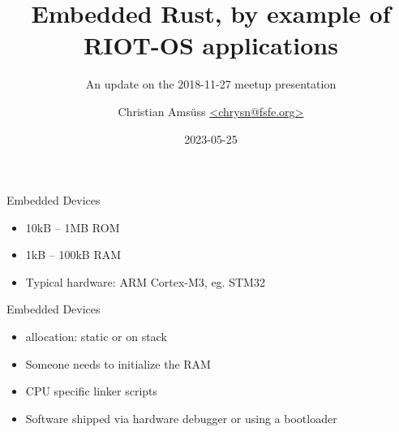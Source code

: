 \documentclass[aspectratio=169]{beamer}
\title{Embedded Rust, by example of RIOT-OS applications}
\author{Christian Amsüss \url{<chrysn@fsfe.org>}}
\subtitle{An update on the 2018-11-27 meetup presentation}
\date{2023-05-25} %
\begin{document}
\frame{\titlepage}

\begin{frame}{Embedded Devices}
  \begin{itemize}
    \item 10kB -- 1MB ROM
    \item 1kB -- 100kB RAM
    \item Typical hardware: ARM Cortex-M3, eg. STM32
  \end{itemize}
\end{frame}

\begin{frame}{Embedded Devices}
  \begin{itemize}
    \item allocation: static or on stack
    \item Someone needs to initialize the RAM
    \item CPU specific linker scripts
    \item Software shipped via hardware debugger or using a bootloader
  \end{itemize}
\end{frame}

% 
% 
% 
% 
% 
% 
% 
\end{document}
